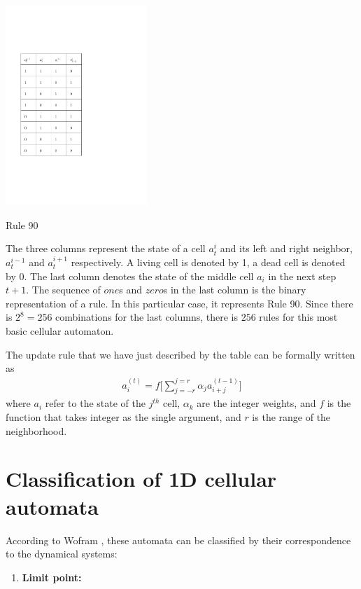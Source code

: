 \begin{enumerate}
\begin{table}[htbp]
 \centering
 \includegraphics[width=0.4\textwidth]{./img/1Drule}
 \caption{Rule 90}
 \label{rule90}
\end{table}


The three columns represent the state of a cell $a_t^i$ and its left and right neighbor, $a_t^{i-1}$ and $a_t^{i+1}$ respectively. A living cell is denoted by 1, a dead cell is denoted by 0. The last column denotes the state of the middle cell $a_i$ in the next step $t+1$. The sequence of $one$s and $zero$s in the last column is the binary representation of a rule. In this particular case, it represents Rule 90.
Since there is $2^8=256$ combinations for the last columns, there is $256$ rules for this most basic cellular automaton.

The update rule that we have just described by the table can be formally written as
\begin{align} \label{rule1}
a_i^{(t)} = f \big[ \sum_{j=-r}^{j=r} \alpha_j a_{i+j}^{(t-1)} \big]
\end{align}
where $a_i$ refer to the state of the $j^{th}$ cell, $\alpha_k$ are the integer weights, and $f$ is the function that takes integer as the single argument, and $r$ is the range of the neighborhood.

\section{Classification of 1D cellular automata}

According to Wofram \cite{wolf}, these automata can be classified by their correspondence to the dynamical systems:
\begin{enumerate}
\item \textbf{Limit point:}


\end{enumerate}
\end{enumerate}
